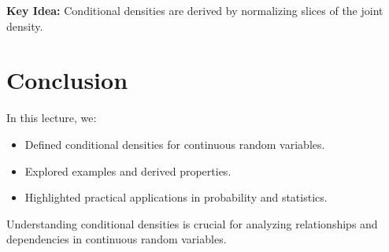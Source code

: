 \documentclass{article}
\begin{document}
\textbf{Key Idea:}
Conditional densities are derived by normalizing slices of the joint density.

\section*{Conclusion}

In this lecture, we:
\begin{itemize}
  \item Defined conditional densities for continuous random variables.
  \item Explored examples and derived properties.
  \item Highlighted practical applications in probability and statistics.
\end{itemize}

Understanding conditional densities is crucial for analyzing relationships and dependencies in continuous random variables.
\end{document}
